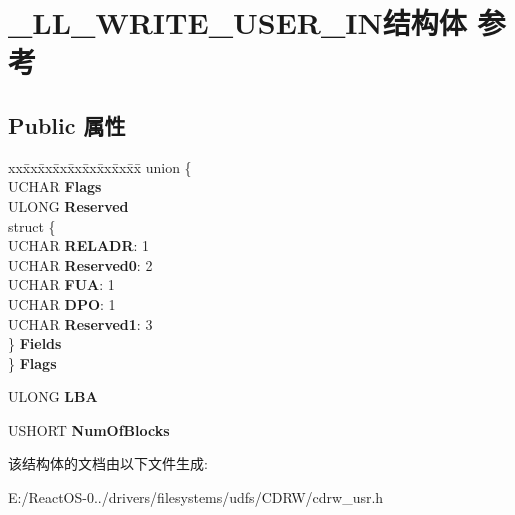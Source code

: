 \hypertarget{struct___l_l___w_r_i_t_e___u_s_e_r___i_n}{}\section{\+\_\+\+L\+L\+\_\+\+W\+R\+I\+T\+E\+\_\+\+U\+S\+E\+R\+\_\+\+I\+N结构体 参考}
\label{struct___l_l___w_r_i_t_e___u_s_e_r___i_n}
\subsection*{Public 属性}
\begin{DoxyCompactItemize}
\item 
\mbox{\label{struct___l_l___w_r_i_t_e___u_s_e_r___i_n_ad6b3e737d67c40b6c30ea9db3263a780}} 
\begin{tabbing}
xx\=xx\=xx\=xx\=xx\=xx\=xx\=xx\=xx\=\kill
union \{\\
\>UCHAR {\bfseries Flags}\\
\>ULONG {\bfseries Reserved}\\
\>struct \{\\
\>\>UCHAR {\bfseries RELADR}: 1\\
\>\>UCHAR {\bfseries Reserved0}: 2\\
\>\>UCHAR {\bfseries FUA}: 1\\
\>\>UCHAR {\bfseries DPO}: 1\\
\>\>UCHAR {\bfseries Reserved1}: 3\\
\>\} {\bfseries Fields}\\
\} {\bfseries Flags}\\

\end{tabbing}\item 
\mbox{\label{struct___l_l___w_r_i_t_e___u_s_e_r___i_n_a9e08cf0e39e40ffe38428f013bb84f43}} 
U\+L\+O\+NG {\bfseries L\+BA}
\item 
\mbox{\label{struct___l_l___w_r_i_t_e___u_s_e_r___i_n_a3a8d26afa82f7288caed36fcf69b95c1}} 
U\+S\+H\+O\+RT {\bfseries Num\+Of\+Blocks}
\end{DoxyCompactItemize}


该结构体的文档由以下文件生成\+:\begin{DoxyCompactItemize}
\item 
E\+:/\+React\+O\+S-\/0../drivers/filesystems/udfs/\+C\+D\+R\+W/cdrw\+\_\+usr.\+h\end{DoxyCompactItemize}
